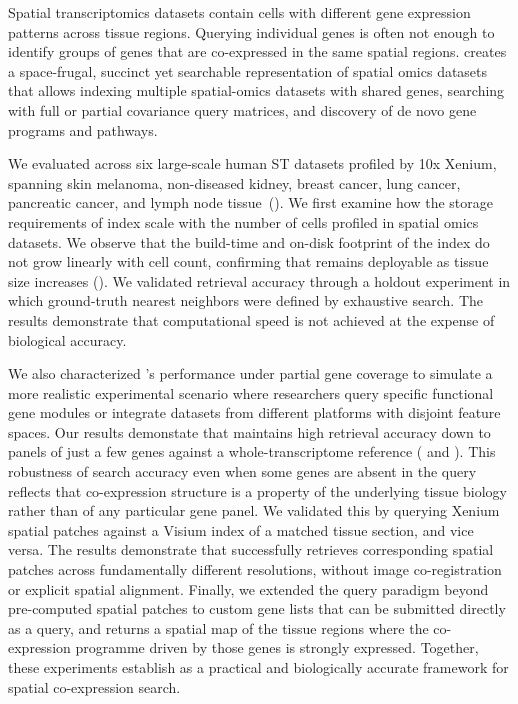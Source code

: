 \documentclass[pdflatex,sn-mathphys-num]{sn-jnl}%
\theoremstyle{thmstyleone}%
\theoremstyle{thmstyletwo}%
\theoremstyle{thmstylethree}%
\begin{document}
Spatial transcriptomics datasets contain cells with different gene expression patterns across tissue regions. Querying individual genes is often not enough to identify groups of genes that are co-expressed in the same spatial regions. \OurMethod{} creates a space-frugal, succinct yet searchable representation of spatial omics datasets that allows indexing multiple spatial-omics datasets with shared genes, searching with full or partial covariance query matrices, and discovery of de novo gene programs and pathways.

We evaluated \OurMethod{} across six large-scale human ST datasets profiled by 10x Xenium, spanning skin melanoma, non-diseased kidney, breast cancer, lung cancer, pancreatic cancer, and lymph node tissue~(). We first examine how the storage requirements of  \OurMethod{} index scale with the number of cells profiled in spatial omics datasets. We observe that the build-time and on-disk footprint of the index do not grow linearly with cell count, confirming that \OurMethod{} remains deployable as tissue size increases (). We validated retrieval accuracy through a holdout experiment in which ground-truth nearest neighbors were defined by exhaustive search. The results demonstrate that computational speed is not achieved at the expense of biological accuracy.

We also characterized \OurMethod{}'s performance under partial gene coverage to simulate a more realistic experimental scenario where researchers query specific functional gene modules or integrate datasets from different platforms with disjoint feature spaces. Our results demonstate that \OurMethod{} maintains high retrieval accuracy down to panels of just a few genes against a whole-transcriptome reference ( and ). This robustness of search accuracy even when some genes are absent in the query reflects that co-expression structure is a property of the underlying tissue biology rather than of any particular gene panel. We validated this by querying Xenium spatial patches against a Visium index of a matched tissue section, and vice versa. The results demonstrate that \OurMethod{} successfully retrieves corresponding spatial patches across fundamentally different resolutions, without image co-registration or explicit spatial alignment. Finally, we extended the query paradigm beyond pre-computed spatial patches to custom gene lists that can be submitted directly as a query, and \OurMethod{} returns a spatial map of the tissue regions where the co-expression programme driven by those genes is strongly expressed. Together, these experiments establish \OurMethod{} as a practical and biologically accurate framework for spatial co-expression search.
\end{document}
